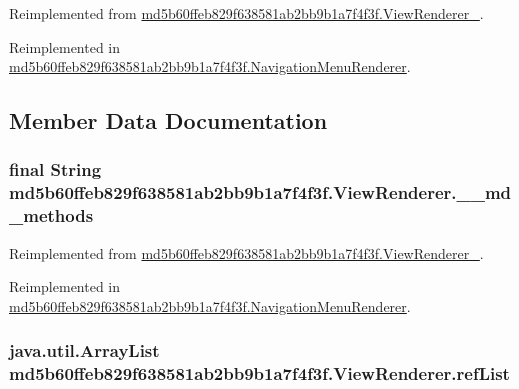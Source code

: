 Reimplemented from \hyperlink{classmd5b60ffeb829f638581ab2bb9b1a7f4f3f_1_1_view_renderer__2_dae20979ac761a65aa60c9b427509c37}{md5b60ffeb829f638581ab2bb9b1a7f4f3f.ViewRenderer\_}.

Reimplemented in \hyperlink{classmd5b60ffeb829f638581ab2bb9b1a7f4f3f_1_1_navigation_menu_renderer_8d79995c853bf4f40da4f067cd501048}{md5b60ffeb829f638581ab2bb9b1a7f4f3f.NavigationMenuRenderer}.

\subsection{Member Data Documentation}
\hypertarget{classmd5b60ffeb829f638581ab2bb9b1a7f4f3f_1_1_view_renderer_9d61e0ff54f2c1a789912ef2d2e97d9d}{
\subsubsection[{\_\-\_\-md\_\-methods}]{\setlength{\rightskip}{0pt plus 5cm}final String {\bf md5b60ffeb829f638581ab2bb9b1a7f4f3f.ViewRenderer.\_\-\_\-md\_\-methods}}}
\label{classmd5b60ffeb829f638581ab2bb9b1a7f4f3f_1_1_view_renderer_9d61e0ff54f2c1a789912ef2d2e97d9d}




Reimplemented from \hyperlink{classmd5b60ffeb829f638581ab2bb9b1a7f4f3f_1_1_view_renderer__2_80b609e3e4054c380887d4dc2907a875}{md5b60ffeb829f638581ab2bb9b1a7f4f3f.ViewRenderer\_}.

Reimplemented in \hyperlink{classmd5b60ffeb829f638581ab2bb9b1a7f4f3f_1_1_navigation_menu_renderer_0f4bfebe2cdfd607a2a7599e832cfbdc}{md5b60ffeb829f638581ab2bb9b1a7f4f3f.NavigationMenuRenderer}.\hypertarget{classmd5b60ffeb829f638581ab2bb9b1a7f4f3f_1_1_view_renderer_0833259dc6ac4a65396cf7f3fedd9f17}{
\subsubsection[{refList}]{\setlength{\rightskip}{0pt plus 5cm}java.util.ArrayList {\bf md5b60ffeb829f638581ab2bb9b1a7f4f3f.ViewRenderer.refList}}}
\label{classmd5b60ffeb829f638581ab2bb9b1a7f4f3f_1_1_view_renderer_0833259dc6ac4a65396cf7f3fedd9f17}




